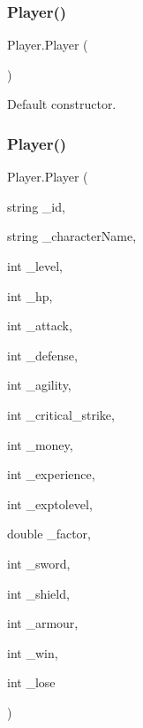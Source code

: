 \subsubsection{\texorpdfstring{Player()}{Player()}\hspace{0.1cm}{\footnotesize\ttfamily [1/2]}}
{\footnotesize\ttfamily Player.\+Player (\begin{DoxyParamCaption}{ }\end{DoxyParamCaption})\hspace{0.3cm}{\ttfamily [inline]}}



Default constructor. 

\mbox{\label{class_player_ad275d2e546547d19fca625bad0dd9dc6}} 
\subsubsection{\texorpdfstring{Player()}{Player()}\hspace{0.1cm}{\footnotesize\ttfamily [2/2]}}
{\footnotesize\ttfamily Player.\+Player (\begin{DoxyParamCaption}\item[{string}]{\+\_\+id,  }\item[{string}]{\+\_\+character\+Name,  }\item[{int}]{\+\_\+level,  }\item[{int}]{\+\_\+hp,  }\item[{int}]{\+\_\+attack,  }\item[{int}]{\+\_\+defense,  }\item[{int}]{\+\_\+agility,  }\item[{int}]{\+\_\+critical\+\_\+strike,  }\item[{int}]{\+\_\+money,  }\item[{int}]{\+\_\+experience,  }\item[{int}]{\+\_\+exptolevel,  }\item[{double}]{\+\_\+factor,  }\item[{int}]{\+\_\+sword,  }\item[{int}]{\+\_\+shield,  }\item[{int}]{\+\_\+armour,  }\item[{int}]{\+\_\+win,  }\item[{int}]{\+\_\+lose }\end{DoxyParamCaption})\hspace{0.3cm}{\ttfamily [inline]}}



